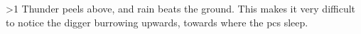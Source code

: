 
\ifnum\value{temperature}>1
  \mouthdigger
  Thunder peels above, and rain beats the ground.
  This makes it very difficult to notice the \gls{digger} burrowing upwards, towards where the \glspl{pc} sleep.

\fi

